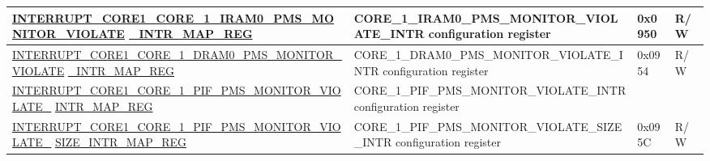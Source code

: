 \begin{landscape}
\begin{longtable}{ | p{10cm} | p{10.2cm} | p{1.3cm} | p{1cm} | }
\hyperref[regdesc:INTERRUPTCORE1CORE1IRAM0PMSMONITORVIOLATEINTRMAPREG]{INTERRUPT\_CORE1\_CORE\_1\_IRAM0\_PMS\_MONITOR\_VIOLATE} 
\hyperref[regdesc:INTERRUPTCORE1CORE1IRAM0PMSMONITORVIOLATEINTRMAPREG]{\_INTR\_MAP\_REG} 
& CORE\_1\_IRAM0\_PMS\_MONITOR\_VIOLATE\_INTR configuration register & \multirow{2}{*}{0x0950} & \multirow{2}{*}{R/W} \\ \hline


\hyperref[regdesc:INTERRUPTCORE1CORE1DRAM0PMSMONITORVIOLATEINTRMAPREG]{INTERRUPT\_CORE1\_CORE\_1\_DRAM0\_PMS\_MONITOR\_VIOLATE} 
\hyperref[regdesc:INTERRUPTCORE1CORE1DRAM0PMSMONITORVIOLATEINTRMAPREG]{\_INTR\_MAP\_REG}
& CORE\_1\_DRAM0\_PMS\_MONITOR\_VIOLATE\_INTR configuration register & \multirow{2}{*}{0x0954} & \multirow{2}{*}{R/W} \\ \hline

\hyperref[regdesc:INTERRUPTCORE1CORE1PIFPMSMONITORVIOLATEINTRMAPREG]{INTERRUPT\_CORE1\_CORE\_1\_PIF\_PMS\_MONITOR\_VIOLATE\_} 
\hyperref[regdesc:INTERRUPTCORE1CORE1PIFPMSMONITORVIOLATEINTRMAPREG]{INTR\_MAP\_REG} 
& CORE\_1\_PIF\_PMS\_MONITOR\_VIOLATE\_INTR configuration register & \multirow{2}{*}{0x0958} & \multirow{2}{*}{R/W} \\ \hline

\hyperref[regdesc:INTERRUPTCORE1CORE1PIFPMSMONITORVIOLATESIZEINTRMAPREG]{INTERRUPT\_CORE1\_CORE\_1\_PIF\_PMS\_MONITOR\_VIOLATE\_} 
\hyperref[regdesc:INTERRUPTCORE1CORE1PIFPMSMONITORVIOLATESIZEINTRMAPREG]{SIZE\_INTR\_MAP\_REG} 
& CORE\_1\_PIF\_PMS\_MONITOR\_VIOLATE\_SIZE\_INTR configuration register & \multirow{2}{*}{0x095C} & \multirow{2}{*}{R/W} \\ \hline



\end{longtable}
\end{landscape}
